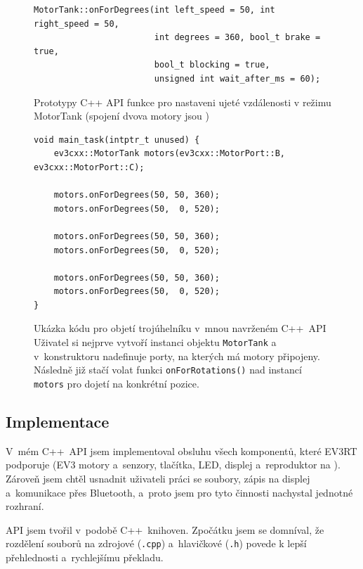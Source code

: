 \begin{figure}[H] 
    \begin{verbatim}
MotorTank::onForDegrees(int left_speed = 50, int right_speed = 50, 
                        int degrees = 360, bool_t brake = true, 
                        bool_t blocking = true, 
                        unsigned int wait_after_ms = 60);
    \end{verbatim}
    \caption[Prototypy C++ API funkce pro nastaveni ujeté vzdálenosti v režimu MotorTank]{Prototypy C++ API funkce pro nastaveni ujeté vzdálenosti v režimu MotorTank (spojení dvova motory jsou )}
    \label{src:ev3cxx_motor-rotate}
\end{figure}
\begin{figure}[H] 
    \begin{verbatim}
void main_task(intptr_t unused) {    
    ev3cxx::MotorTank motors(ev3cxx::MotorPort::B, ev3cxx::MotorPort::C);   
    
    motors.onForDegrees(50, 50, 360);
    motors.onForDegrees(50,  0, 520);

    motors.onForDegrees(50, 50, 360);
    motors.onForDegrees(50,  0, 520); 

    motors.onForDegrees(50, 50, 360);
    motors.onForDegrees(50,  0, 520);
}
    \end{verbatim}
    \caption[Ukázka kódu pro objetí trojúhelníku v~mnou navrženém C++~API]{Ukázka kódu pro objetí trojúhelníku v~mnou navrženém C++~API \\
    Uživatel si nejprve vytvoří instanci objektu \texttt{MotorTank} a v~konstruktoru nadefinuje porty, na kterých má motory připojeny. 
    Následně již stačí volat funkci \texttt{onForRotations()} nad instancí \texttt{motors} pro dojetí na konkrétní pozice.    
    }
    \label{src:ev3cxx-triangle}
\end{figure}

\subsection{Implementace}


V~mém C++~API jsem implementoval obsluhu všech komponentů, které EV3RT podporuje (EV3 motory a~senzory, tlačítka, LED, displej a~reproduktor na ).
Zároveň jsem chtěl usnadnit uživateli práci se soubory, zápis na displej a~komunikace přes Bluetooth, a~proto jsem pro tyto činnosti nachystal  jednotné rozhraní.

API jsem tvořil v~podobě C++~knihoven. 
Zpočátku jsem se domníval, že rozdělení souborů na zdrojové (\texttt{.cpp}) a~hlavičkové (\texttt{.h}) povede k lepší přehlednosti a~rychlejšímu překladu.

